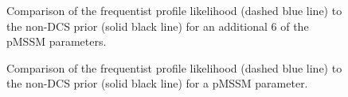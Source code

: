 \begin{figure}[htbp]
{}
\hspace{2mm}
\hspace{2mm}
\caption{Comparison of the frequentist profile likelihood (dashed blue line) to the non-DCS prior (solid black line) for an additional 6 of the pMSSM parameters. }
\label{fig:PandP3}
\end{figure}


\renewcommand*\thesubfigure{\arabic{subfigure}}
\begin{figure}[htbp]
\centering
\hspace{2mm}
\caption{Comparison of the frequentist profile likelihood (dashed blue line) to the non-DCS prior (solid black line) for a pMSSM parameter. }
\label{fig:PandP4}
\end{figure}
